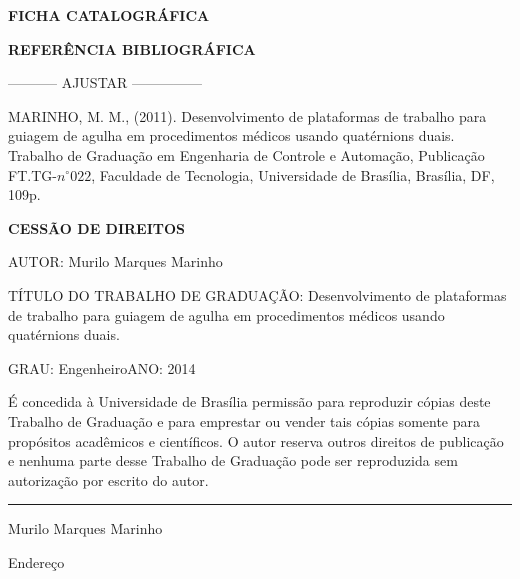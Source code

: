 \noindent \textbf{FICHA CATALOGRÁFICA}

\noindent %

\noindent \medskip{}


\noindent \textbf{REFERÊNCIA BIBLIOGRÁFICA}

----------- AJUSTAR ---------------

MARINHO, M. M., (2011). Desenvolvimento de plataformas de trabalho
para guiagem de agulha em procedimentos médicos usando quatérnions
duais. Trabalho de Graduação em Engenharia de Controle e Automação,
Publicação FT.TG-$n^{\circ}022$, Faculdade de Tecnologia, Universidade
de Brasília, Brasília, DF, 109p.

\noindent \bigskip{}


\noindent \textbf{CESSÃO DE DIREITOS}

\noindent AUTOR: Murilo Marques Marinho

TÍTULO DO TRABALHO DE GRADUAÇÃO: Desenvolvimento de plataformas de
trabalho para guiagem de agulha em procedimentos médicos usando quatérnions
duais.

\noindent \medskip{}


\noindent GRAU: Engenheiro\hfill{}ANO: 2014\hfill{}

\noindent \medskip{}


É concedida à Universidade de Brasília permissão para reproduzir cópias
deste Trabalho de Graduação e para emprestar ou vender tais cópias
somente para propósitos acadêmicos e científicos. O autor reserva
outros direitos de publicação e nenhuma parte desse Trabalho de Graduação
pode ser reproduzida sem autorização por escrito do autor.

\noindent \bigskip{}


\noindent \rule[0.5ex]{1\columnwidth}{1pt}

\noindent Murilo Marques Marinho

\noindent Endereço
